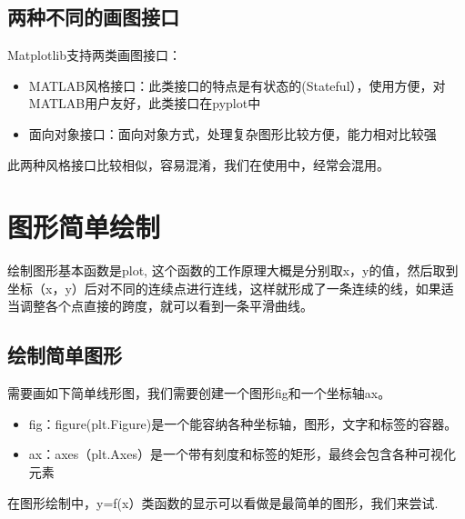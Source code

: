 \documentclass[letterpaper,10pt,english]{sphinxhowto}
\begin{document}
\subsection{两种不同的画图接口}
\label{\detokenize{matplotlib_u7b80_u4ecb:id5}}
Matplotlib支持两类画图接口：
\begin{itemize}
\item {} 
MATLAB风格接口：此类接口的特点是有状态的(Stateful），使用方便，对MATLAB用户友好，此类接口在pyplot中

\item {} 
面向对象接口：面向对象方式，处理复杂图形比较方便，能力相对比较强

\end{itemize}

此两种风格接口比较相似，容易混淆，我们在使用中，经常会混用。


\section{图形简单绘制}
\label{\detokenize{_u56fe_u5f62_u7b80_u5355_u7ed8_u5236:id1}}\label{\detokenize{_u56fe_u5f62_u7b80_u5355_u7ed8_u5236::doc}}
绘制图形基本函数是plot, 这个函数的工作原理大概是分别取x，y的值，然后取到坐标（x，y）后对不同的连续点进行连线，这样就形成了一条连续的线，如果适当调整各个点直接的跨度，就可以看到一条平滑曲线。


\subsection{绘制简单图形}
\label{\detokenize{_u56fe_u5f62_u7b80_u5355_u7ed8_u5236:id2}}
需要画如下简单线形图，我们需要创建一个图形fig和一个坐标轴ax。
\begin{itemize}
\item {} 
fig：figure(plt.Figure)是一个能容纳各种坐标轴，图形，文字和标签的容器。

\item {} 
ax：axes（plt.Axes）是一个带有刻度和标签的矩形，最终会包含各种可视化元素

\end{itemize}

在图形绘制中，y=f(x）类函数的显示可以看做是最简单的图形，我们来尝试.
\end{document}
